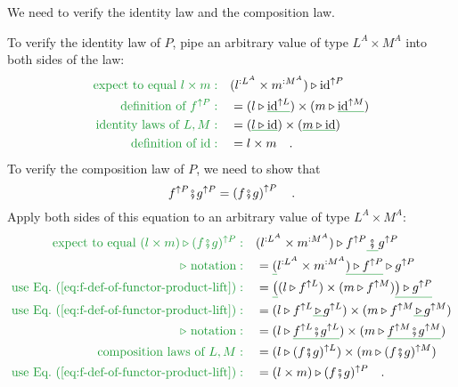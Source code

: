 We need to verify the identity law and the composition law.

To verify the identity law of $P$, pipe an arbitrary value of type
$L^{A}\times M^{A}$ into both sides of the law:
\begin{align*}
{\color{greenunder}\text{expect to equal }l\times m:}\quad & (l^{:L^{A}}\times m^{:M^{A}})\triangleright\text{id}^{\uparrow P}\\
{\color{greenunder}\text{definition of }f^{\uparrow P}:}\quad & =(l\triangleright\gunderline{\text{id}^{\uparrow L}})\times(m\triangleright\gunderline{\text{id}^{\uparrow M}})\\
{\color{greenunder}\text{identity laws of }L,M:}\quad & =(\gunderline{l\triangleright\text{id}})\times(\gunderline{m\triangleright\text{id}})\\
{\color{greenunder}\text{definition of }\text{id}:}\quad & =l\times m\quad.
\end{align*}
To verify the composition law of $P$, we need to show that
\[
f^{\uparrow P}\bef g^{\uparrow P}=\left(f\bef g\right)^{\uparrow P}\quad.
\]
Apply both sides of this equation to an arbitrary value of type $L^{A}\times M^{A}$:
\begin{align*}
{\color{greenunder}\text{expect to equal }(l\times m)\triangleright(f\bef g)^{\uparrow P}:}\quad & (l^{:L^{A}}\times m^{:M^{A}})\triangleright f^{\uparrow P}\gunderline{\,\bef\,}g^{\uparrow P}\\
{\color{greenunder}\triangleright\text{ notation}:}\quad & =\gunderline (l^{:L^{A}}\times m^{:M^{A}}\gunderline{)\triangleright f^{\uparrow P}}\triangleright g^{\uparrow P}\\
{\color{greenunder}\text{use Eq.~(\ref{eq:f-def-of-functor-product-lift})}:}\quad & =\gunderline{\big(}(l\triangleright f^{\uparrow L})\times(m\triangleright f^{\uparrow M})\gunderline{\big)\triangleright g^{\uparrow P}}\\
{\color{greenunder}\text{use Eq.~(\ref{eq:f-def-of-functor-product-lift})}:}\quad & =(l\triangleright f^{\uparrow L}\gunderline{\,\triangleright\,}g^{\uparrow L})\times(m\triangleright f^{\uparrow M}\gunderline{\,\triangleright\,}g^{\uparrow M})\\
{\color{greenunder}\triangleright\text{ notation}:}\quad & =(l\triangleright\gunderline{f^{\uparrow L}\bef g^{\uparrow L}})\times(m\triangleright\gunderline{f^{\uparrow M}\bef g^{\uparrow M}})\\
{\color{greenunder}\text{composition laws of }L,M:}\quad & =(l\triangleright(f\bef g)^{\uparrow L})\times(m\triangleright(f\bef g)^{\uparrow M})\\
{\color{greenunder}\text{use Eq.~(\ref{eq:f-def-of-functor-product-lift})}:}\quad & =(l\times m)\triangleright(f\bef g)^{\uparrow P}\quad.
\end{align*}
